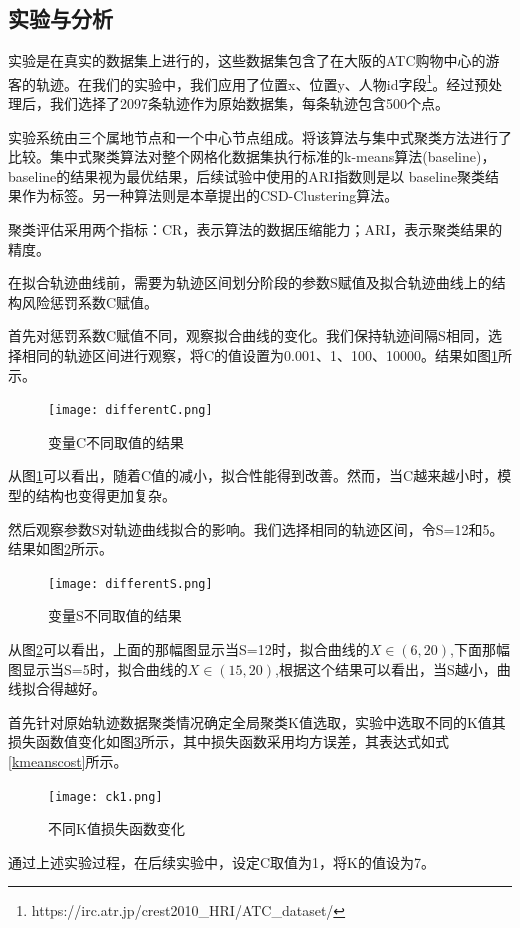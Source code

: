 \subsection{实验与分析}
实验是在真实的数据集上进行的，这些数据集包含了在大阪的ATC购物中心的游客的轨迹。在我们的实验中，我们应用了位置x、位置y、人物id字段\footnote[1]{https://irc.atr.jp/crest2010_HRI/ATC_dataset/}。经过预处理后，我们选择了2097条轨迹作为原始数据集，每条轨迹包含500个点。

实验系统由三个属地节点和一个中心节点组成。将该算法与集中式聚类方法进行了比较。集中式聚类算法对整个网格化数据集执行标准的k-means算法(baseline)， baseline的结果视为最优结果，后续试验中使用的ARI指数则是以 baseline聚类结果作为标签。另一种算法则是本章提出的CSD-Clustering算法。

聚类评估采用两个指标：CR，表示算法的数据压缩能力；ARI，表示聚类结果的精度。

在拟合轨迹曲线前，需要为轨迹区间划分阶段的参数S赋值及拟合轨迹曲线上的结构风险惩罚系数C赋值。

首先对惩罚系数C赋值不同，观察拟合曲线的变化。我们保持轨迹间隔S相同，选择相同的轨迹区间进行观察，将C的值设置为0.001、1、100、10000。结果如图\ref{differentC}所示。
\begin{figure}[H]
	\texttt{[image: differentC.png]}
	\caption{变量C不同取值的结果}
	\label{differentC}
\end{figure}

从图\ref{differentC}可以看出，随着C值的减小，拟合性能得到改善。然而，当C越来越小时，模型的结构也变得更加复杂。

然后观察参数S对轨迹曲线拟合的影响。我们选择相同的轨迹区间，令S=12和5。结果如图\ref{differentS}所示。
\begin{figure}[H]
	\texttt{[image: differentS.png]}
	\caption{变量S不同取值的结果}
	\label{differentS}
\end{figure}

从图\ref{differentS}可以看出，上面的那幅图显示当S=12时，拟合曲线的$X∈(6,20)$,下面那幅图显示当S=5时，拟合曲线的$X∈(15,20)$,根据这个结果可以看出，当S越小，曲线拟合得越好。



首先针对原始轨迹数据聚类情况确定全局聚类K值选取，实验中选取不同的K值其损失函数值变化如图\ref{ck}所示，其中损失函数采用均方误差，其表达式如式\ref{kmeanscost}所示。
\begin{figure}[H]
	\texttt{[image: ck1.png]}
	\caption{不同K值损失函数变化}
	\label{ck}
\end{figure}

通过上述实验过程，在后续实验中，设定C取值为1，将K的值设为7。

